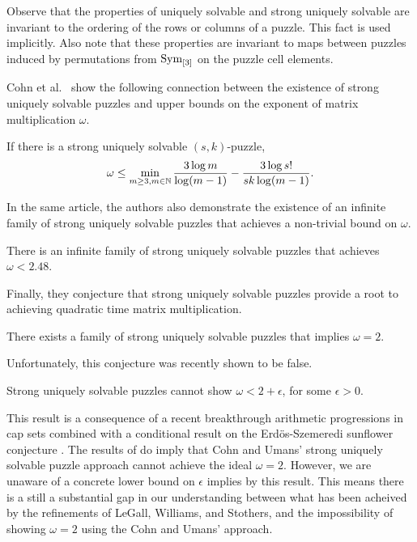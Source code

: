 \documentclass[11pt]{article}
\newcommand\Sym[1]{\ensuremath{\mathrm{Sym}_{#1}}}
\begin{document}
Observe that the properties of uniquely solvable and strong uniquely
solvable are invariant to the ordering of the rows or columns of a
puzzle.  This fact is used implicitly.  Also note that these
properties are invariant to maps between puzzles induced by
permutations from \Sym{\ordset{3}} on the puzzle cell elements.

Cohn et al.~ show the following connection between the existence of
strong uniquely solvable puzzles and upper bounds on the exponent of
matrix multiplication $\omega$.

\begin{lemma}
  If there is a strong uniquely solvable $(s,k)$-puzzle,
  $$\omega \le \min_{m \ge 3, m \in \mathbb{N}} \frac{3 \log
    m}{\log(m-1)} - \frac{3 \log s!}{sk \log(m-1)}.$$
\end{lemma}

In the same article, the authors also demonstrate the existence of an
infinite family of strong uniquely solvable puzzles that achieves a
non-trivial bound on $\omega$.

\begin{lemma}
  There is an infinite family of strong uniquely solvable puzzles that
  achieves $\omega < 2.48$.
\end{lemma}

Finally, they conjecture that strong uniquely solvable puzzles provide
a root to achieving quadratic time matrix multiplication.

\begin{conjecture}
  There exists a family of strong uniquely solvable puzzles that
  implies $\omega = 2$.
\end{conjecture}

Unfortunately, this conjecture was recently shown to be false.

\begin{lemma}
  Strong uniquely solvable puzzles cannot show $\omega < 2 +
  \epsilon$, for some $\epsilon > 0$.
\end{lemma}

This result is a consequence of a recent breakthrough arithmetic
progressions in cap sets \cite{e16,clp16} combined with a conditional
result on the Erd\"{o}s-Szemeredi sunflower conjecture \cite{asu13}.
The results of \cite{bccgu16} do imply that Cohn and Umans' strong
uniquely solvable puzzle approach cannot achieve the ideal $\omega =
2$.  However, we are unaware of a concrete lower bound on $\epsilon$
implies by this result.  This means there is a still a substantial gap
in our understanding between what has been acheived by the refinements
of LeGall, Williams, and Stothers, and the impossibility of showing
$\omega = 2$ using the Cohn and Umans' approach.
\end{document}
